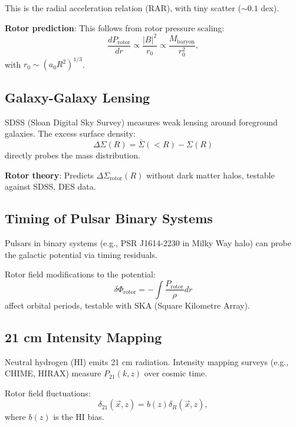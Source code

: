 \documentclass[12pt,a4paper]{article}
\theoremstyle{definition}
\theoremstyle{remark}
\begin{document}
This is the radial acceleration relation (RAR), with tiny scatter ($\sim 0.1$ dex).

\textbf{Rotor prediction}: This follows from rotor pressure scaling:
\begin{equation}
\frac{dP_{\text{rotor}}}{dr} \propto \frac{|B|^2}{r_0} \propto \frac{M_{\text{baryon}}}{r_0^2},
\end{equation}
with $r_0 \sim (a_0 R^2)^{1/3}$.

\subsection{Galaxy-Galaxy Lensing}

SDSS (Sloan Digital Sky Survey) measures weak lensing around foreground galaxies. The excess surface density:
\begin{equation}
\Delta\Sigma(R) = \bar{\Sigma}(<R) - \Sigma(R)
\end{equation}
directly probes the mass distribution.

\textbf{Rotor theory}: Predicts $\Delta\Sigma_{\text{rotor}}(R)$ without dark matter halos, testable against SDSS, DES data.

\subsection{Timing of Pulsar Binary Systems}

Pulsars in binary systems (e.g., PSR J1614-2230 in Milky Way halo) can probe the galactic potential via timing residuals.

Rotor field modifications to the potential:
\begin{equation}
\delta \Phi_{\text{rotor}} = -\int \frac{P_{\text{rotor}}}{\rho} dr
\end{equation}
affect orbital periods, testable with SKA (Square Kilometre Array).

\subsection{21 cm Intensity Mapping}

Neutral hydrogen (HI) emits 21 cm radiation. Intensity mapping surveys (e.g., CHIME, HIRAX) measure $P_{21}(k, z)$ over cosmic time.

Rotor field fluctuations:
\begin{equation}
\delta_{21}(\vec{x}, z) = b(z) \delta_R(\vec{x}, z),
\end{equation}
where $b(z)$ is the HI bias.
\end{document}
